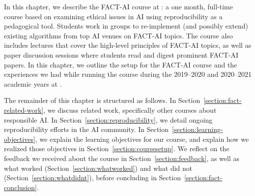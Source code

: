 In this chapter, we describe the FACT-AI course at \OurUniversity{}: a one month, full-time course based on examining ethical issues in AI using reproducibility as a pedagogical tool. 
Students work in groups to re-implement (and possibly extend) existing algorithms from top AI venues on \ac{FACT-AI} topics. 
The course also includes lectures that cover the high-level principles of FACT-AI topics, as well as paper discussion sessions where students read and digest prominent FACT-AI papers. 
In this chapter, we outline the setup for the \ac{FACT-AI} course and the experiences we had while running the course during the 2019--2020 and 2020--2021 academic years at \OurUniversity{}. 

The remainder of this chapter is structured as follows. 
In Section~\ref{section:fact-related-work}, we discuss related work, specifically other courses about responsible AI. 
In Section~\ref{section:reproducibility}, we detail ongoing reproducibility efforts in the AI community. 
In Section~\ref{section:learning-objectives}, we explain the learning objectives for our course, and explain how we realized those objectives in Section~\ref{section:coursesetup}. 
We reflect on the feedback we received about the course in Section~\ref{section:feedback}, as well as what worked (Section~\ref{section:whatworked}) and what did not (Section~\ref{section:whatdidnt}), before concluding in Section~\ref{section:fact-conclusion}. 
